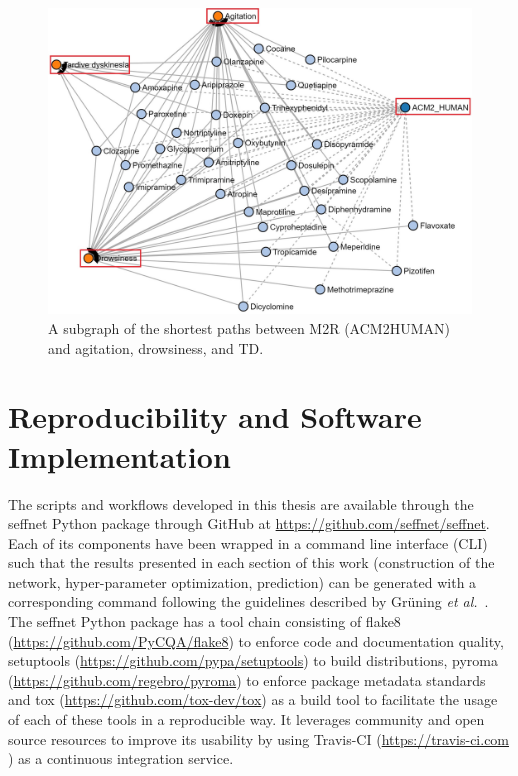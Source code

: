 \begin{figure}[h!]
    \centering
    \includegraphics[scale=0.6]
    {figures/chrm2_phenotypes.jpg}
    \caption[The shortest paths between M2R, agitation, drowsiness, and tardive dyskinesia]{\label{fig:chrm2_phenotypes} A subgraph of the shortest paths between M2R (ACM2\textunderscore HUMAN) and agitation, drowsiness, and \ac{TD}.}
\end{figure}


\section{Reproducibility and Software Implementation}

The scripts and workflows developed in this thesis are available through the seffnet Python package through GitHub at \url{https://github.com/seffnet/seffnet}.
Each of its components have been wrapped in a command line interface (CLI) such that the results presented in each section of this work (construction of the network, hyper-parameter optimization, prediction) can be generated with a corresponding command following the guidelines described by Grüning \textit{et al.}~\cite{gruning_software_2019}.
The seffnet Python package has a tool chain consisting of flake8 (\url{https://github.com/PyCQA/flake8}) to enforce code and documentation quality, setuptools (\url{https://github.com/pypa/setuptools}) to build distributions, pyroma (\url{https://github.com/regebro/pyroma}) to enforce package metadata standards and tox (\url{https://github.com/tox-dev/tox}) as a build tool to facilitate the usage of each of these tools in a reproducible way.
It leverages community and open source resources to improve its usability by using Travis-CI (\url{https://travis-ci.com} ) as a continuous integration service.

